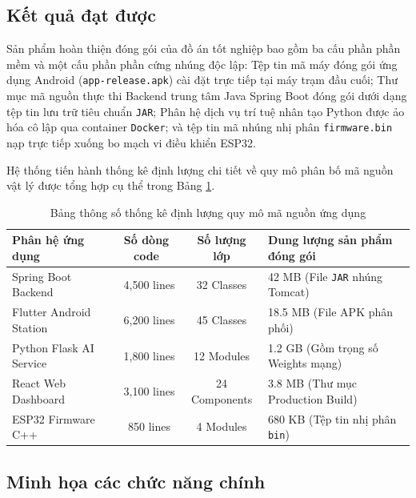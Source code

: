 \documentclass[../DoAn.tex]{subfiles}
\begin{document}
\subsection{Kết quả đạt được}

Sản phẩm hoàn thiện đóng gói của đồ án tốt nghiệp bao gồm ba cấu phần phần mềm và một cấu phần phần cứng nhúng độc lập: Tệp tin mã máy đóng gói ứng dụng Android (\texttt{app-release.apk}) cài đặt trực tiếp tại máy trạm đầu cuối; Thư mục mã nguồn thực thi Backend trung tâm Java Spring Boot đóng gói dưới dạng tệp tin lưu trữ tiêu chuẩn \texttt{JAR}; Phân hệ dịch vụ trí tuệ nhân tạo Python được ảo hóa cô lập qua container \texttt{Docker}; và tệp tin mã nhúng nhị phân \texttt{firmware.bin} nạp trực tiếp xuống bo mạch vi điều khiển ESP32.

Hệ thống tiến hành thống kê định lượng chi tiết về quy mô phân bố mã nguồn vật lý được tổng hợp cụ thể trong Bảng \ref{table:source_stats}.

\begin{table}[tbhp]
\centering
\small
\renewcommand{\arraystretch}{1.3}
\caption{Bảng thông số thống kê định lượng quy mô mã nguồn ứng dụng}
\label{table:source_stats}
\begin{tabular}{|p{4cm}|c|c|p{4.5cm}|}
\hline
\textbf{Phân hệ ứng dụng} & \textbf{Số dòng code} & \textbf{Số lượng lớp} & \textbf{Dung lượng sản phẩm đóng gói} \\
\hline
Spring Boot Backend & ~4,500 lines & 32 Classes & 42 MB (File \texttt{JAR} nhúng Tomcat) \\
\hline
Flutter Android Station & ~6,200 lines & 45 Classes & 18.5 MB (File APK phân phối) \\
\hline
Python Flask AI Service & ~1,800 lines & 12 Modules & 1.2 GB (Gồm trọng số Weights mạng) \\
\hline
React Web Dashboard & ~3,100 lines & 24 Components & 3.8 MB (Thư mục Production Build) \\
\hline
ESP32 Firmware C++ & ~850 lines & 4 Modules & 680 KB (Tệp tin nhị phân \texttt{bin}) \\
\hline
\end{tabular}
\end{table}

\subsection{Minh họa các chức năng chính}
\end{document}
